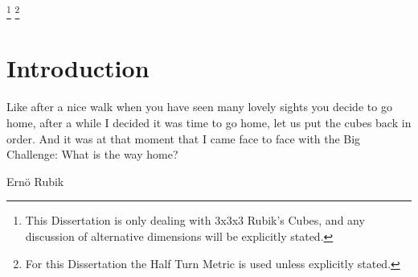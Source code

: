 \documentclass{report}
\newcommand{\tbo}[1]{\textbf{#1}}
\begin{document}
	\textcolor{white}{
		\footnote{\label{footnote:cube}This Dissertation is only dealing with 3x3x3 Rubik's Cubes, and any discussion of alternative dimensions will be explicitly stated.}
		\footnote{\label{footnote:metric}For this Dissertation the Half Turn Metric is used unless explicitly stated.}		
	}



	\newpage
	\tableofcontents
	\newpage

	\renewcommand{\thechapter}{\arabic{chapter}}
	\setcounter{chapter}{0}
	\chapter{Introduction}
	\epigraph{Like after a nice walk when you have seen many lovely sights you decide to go home, after a while I decided it was time to go home, let us put the cubes back in order. And it was at that moment that I came face to face with the Big Challenge: What is the way home?}{Ern\"{o} Rubik \cite{Rubik1986}}
	
\end{document}
